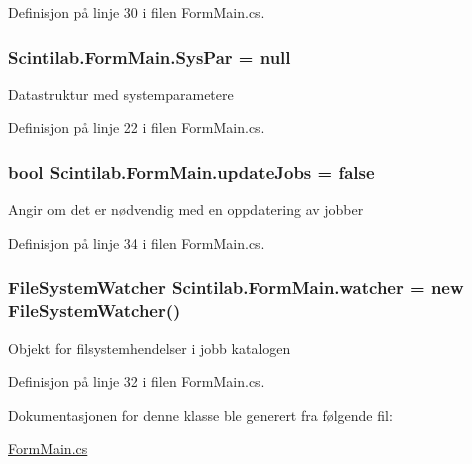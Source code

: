 Definisjon på linje 30 i filen Form\+Main.\+cs.

\hypertarget{class_scintilab_1_1_form_main_ad41498eb151a72c77ad94c7285d0f506}{
\subsubsection[{Sys\+Par}]{ Scintilab.\+Form\+Main.\+Sys\+Par = null\hspace{0.3cm}{\ttfamily [private]}}}\label{class_scintilab_1_1_form_main_ad41498eb151a72c77ad94c7285d0f506}
Datastruktur med systemparametere 

Definisjon på linje 22 i filen Form\+Main.\+cs.

\hypertarget{class_scintilab_1_1_form_main_a751a47b90ebd11367991fc095818d8a2}{
\subsubsection[{update\+Jobs}]{\setlength{\rightskip}{0pt plus 5cm}bool Scintilab.\+Form\+Main.\+update\+Jobs = false\hspace{0.3cm}{\ttfamily [private]}}}\label{class_scintilab_1_1_form_main_a751a47b90ebd11367991fc095818d8a2}
Angir om det er nødvendig med en oppdatering av jobber 

Definisjon på linje 34 i filen Form\+Main.\+cs.

\hypertarget{class_scintilab_1_1_form_main_a0331bda673387e5d96deebd876575d1d}{
\subsubsection[{watcher}]{\setlength{\rightskip}{0pt plus 5cm}File\+System\+Watcher Scintilab.\+Form\+Main.\+watcher = new File\+System\+Watcher()\hspace{0.3cm}{\ttfamily [private]}}}\label{class_scintilab_1_1_form_main_a0331bda673387e5d96deebd876575d1d}
Objekt for filsystemhendelser i jobb katalogen 

Definisjon på linje 32 i filen Form\+Main.\+cs.



Dokumentasjonen for denne klasse ble generert fra følgende fil\+:\begin{DoxyCompactItemize}
\item 
\hyperlink{_form_main_8cs}{Form\+Main.\+cs}\end{DoxyCompactItemize}
